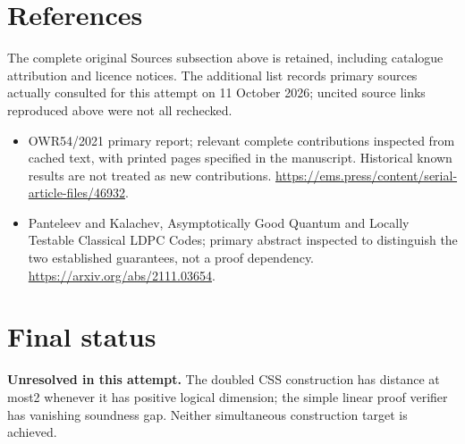\documentclass[11pt]{article}
\begin{document}
\section{References}
The complete original Sources subsection above is retained, including catalogue attribution and licence notices. The additional list records primary sources actually consulted for this attempt on 11 October 2026; uncited source links reproduced above were not all rechecked.
\begin{itemize}
\item OWR54/2021 primary report; relevant complete contributions inspected from cached text, with printed pages specified in the manuscript. Historical known results are not treated as new contributions. \url{https://ems.press/content/serial-article-files/46932}.
\item Panteleev and Kalachev, Asymptotically Good Quantum and Locally Testable Classical LDPC Codes; primary abstract inspected to distinguish the two established guarantees, not a proof dependency. \url{https://arxiv.org/abs/2111.03654}.
\end{itemize}
\section{Final status}
\textbf{Unresolved in this attempt.} The doubled CSS construction has distance at most2 whenever it has positive logical dimension; the simple linear proof verifier has vanishing soundness gap. Neither simultaneous construction target is achieved.
\end{document}
